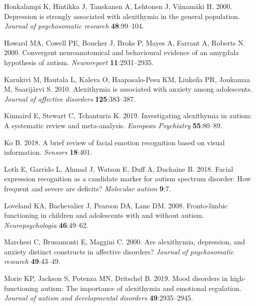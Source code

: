 \documentclass[
]{article}
\newlength{\cslhangindent}
\newlength{\cslentryspacingunit} %
\newenvironment{CSLReferences}[2] %
 {%
  \setlength{\parindent}{0pt}
  \ifodd #1
  \let\oldpar\par
  \def\par{\hangindent=\cslhangindent\oldpar}
  \fi
  \setlength{\parskip}{#2\cslentryspacingunit}
 }%
 {}
\begin{document}
\begin{CSLReferences}{1}{0}
\leavevmode{}%
Honkalampi K, Hintikka J, Tanskanen A, Lehtonen J, Viinamäki H. 2000. Depression is strongly associated with alexithymia in the general population. \emph{Journal of psychosomatic research} \textbf{48}:99--104.

\leavevmode{}%
Howard MA, Cowell PE, Boucher J, Broks P, Mayes A, Farrant A, Roberts N. 2000. Convergent neuroanatomical and behavioural evidence of an amygdala hypothesis of autism. \emph{Neuroreport} \textbf{11}:2931--2935.

\leavevmode{}%
Karukivi M, Hautala L, Kaleva O, Haapasalo-Pesu KM, Liuksila PR, Joukamaa M, Saarijärvi S. 2010. Alexithymia is associated with anxiety among adolescents. \emph{Journal of affective disorders} \textbf{125}:383--387.

\leavevmode{}%
Kinnaird E, Stewart C, Tchanturia K. 2019. Investigating alexithymia in autism: A systematic review and meta-analysis. \emph{European Psychiatry} \textbf{55}:80--89.

\leavevmode{}%
Ko B. 2018. A brief review of facial emotion recognition based on visual information. \emph{Sensors} \textbf{18}:401.

\leavevmode{}%
Loth E, Garrido L, Ahmad J, Watson E, Duff A, Duchaine B. 2018. Facial expression recognition as a candidate marker for autism spectrum disorder: How frequent and severe are deficits? \emph{Molecular autism} \textbf{9}:7.

\leavevmode{}%
Loveland KA, Bachevalier J, Pearson DA, Lane DM. 2008. Fronto-limbic functioning in children and adolescents with and without autism. \emph{Neuropsychologia} \textbf{46}:49--62.

\leavevmode{}%
Marchesi C, Brusamonti E, Maggini C. 2000. Are alexithymia, depression, and anxiety distinct constructs in affective disorders? \emph{Journal of psychosomatic research} \textbf{49}:43--49.

\leavevmode{}%
Morie KP, Jackson S, Potenza MN, Dritschel B. 2019. Mood disorders in high-functioning autism: The importance of alexithymia and emotional regulation. \emph{Journal of autism and developmental disorders} \textbf{49}:2935--2945.


\end{CSLReferences}
\end{document}
